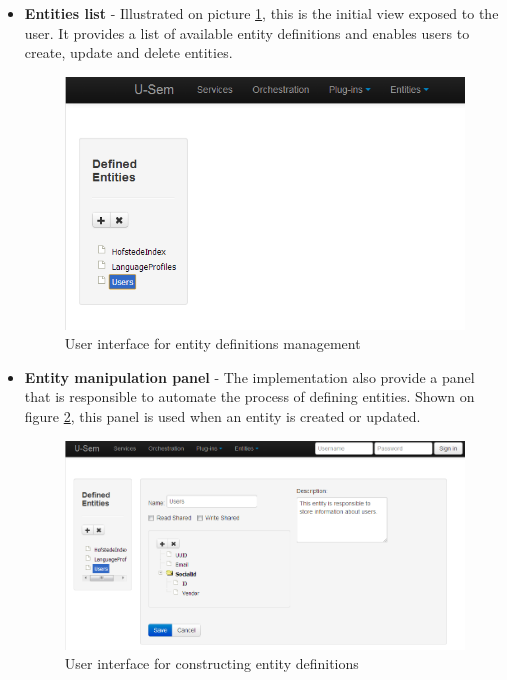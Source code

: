 	\begin{itemize}
	
		\item \textbf{Entities list} - Illustrated on picture \ref{fig:storageEntityList}, this is the initial view exposed to the user. It provides a list of available entity definitions and enables users to create, update and delete entities.
		
\begin{figure}[h!]
  \centering
  	\includegraphics[scale=0.5]{storage/ui/entityList.png}
  \caption{User interface for entity definitions management}
  \label{fig:storageEntityList}
\end{figure}
		
		\item \textbf{Entity manipulation panel} - The implementation also provide a panel that is responsible to automate the process of defining entities. Shown on figure \ref{fig:storageEntityPanel}, this panel is used when an entity is created or updated.
		
\begin{figure}[h!]
  \centering
  	\includegraphics[scale=0.5]{storage/ui/entityPanel.png}
  \caption{User interface for constructing entity definitions}
  \label{fig:storageEntityPanel}
\end{figure}

	\end{itemize}


